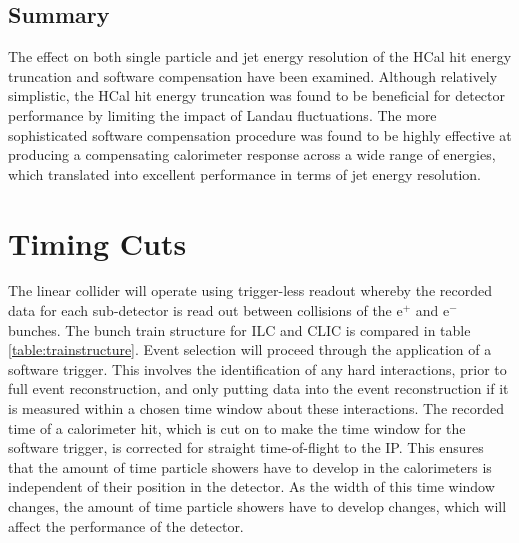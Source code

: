 
\subsection{Summary}
The effect on both single particle and jet energy resolution of the HCal hit energy truncation and software compensation have been examined.  Although relatively simplistic, the HCal hit energy truncation was found to be beneficial for detector performance by limiting the impact of Landau fluctuations.  The more sophisticated software compensation procedure was found to be highly effective at producing a compensating calorimeter response across a wide range of energies, which translated into excellent performance in terms of jet energy resolution.


\section{Timing Cuts}
The linear collider will operate using trigger-less readout whereby the recorded data for each sub-detector is read out between collisions of the $\text{e}^{+}$ and $\text{e}^{-}$ bunches.  The bunch train structure for ILC and CLIC is compared in table \ref{table:trainstructure}.  Event selection will proceed through the application of a software trigger.  This involves the identification of any hard interactions, prior to full event reconstruction, and only putting data into the event reconstruction if it is measured within a chosen time window about these interactions.  The recorded time of a calorimeter hit, which is cut on to make the time window for the software trigger, is corrected for straight time-of-flight to the IP.  This ensures that the amount of time particle showers have to develop in the calorimeters is independent of their position in the detector.  As the width of this time window changes, the amount of time particle showers have to develop changes, which will affect the performance of the detector.  

